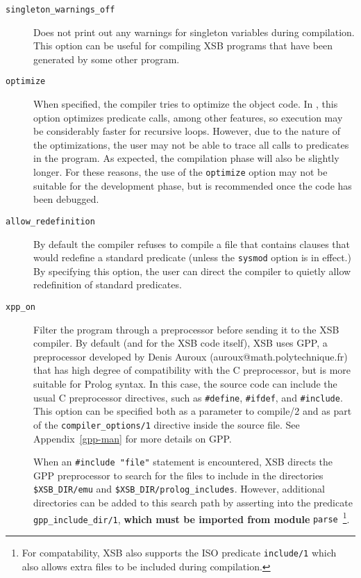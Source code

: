 \begin{description}
\item[{\tt singleton\_warnings\_off}] Does not print out any warnings
  for singleton variables during compilation.  This option can be
  useful for compiling XSB programs that have been generated by some
  other program.
%
\item[{\tt optimize}] When specified, the
  compiler tries to optimize the object code.  In \version, this
  option optimizes predicate calls, among other features, so execution
  may be considerably faster for recursive loops.  However, due to the
  nature of the optimizations, the user may not be able to trace all
  calls to predicates in the program.  As expected, the compilation
  phase will also be slightly longer.  For these reasons, the use of
  the {\tt optimize} option may not be suitable for the development
  phase, but is recommended once the code has been debugged.
%
\item[{\tt allow\_redefinition}] 
	By default the compiler refuses to compile a file that
	contains clauses that would redefine a standard predicate
	(unless the {\tt sysmod} option is in effect.)  By specifying
	this option, the user can direct the compiler to quietly allow
	redefinition of standard predicates.
%
\item[{\tt xpp\_on}]
  Filter the program through a preprocessor  before sending it to the XSB 
  compiler. By default (and for the XSB code itself), XSB uses GPP, a
  preprocessor developed by Denis Auroux (auroux@math.polytechnique.fr)
  that has high degree of compatibility with the C preprocessor, but is
  more suitable for Prolog syntax. In this case, the source code can
  include the usual C 
  preprocessor directives, such as \verb|#define|, \verb|#ifdef|, and
  \verb|#include|. This option can be specified both as a parameter to
  compile/2 and as part of the {\tt compiler\_options/1} directive inside
  the source file. See Appendix~\ref{gpp-man} for more details on GPP.

  When an \verb|#include "file"| statement is encountered, XSB directs
  the GPP preprocessor to search for the files to include in the
  directories \verb|$XSB_DIR/emu| and
  \verb|$XSB_DIR/prolog_includes|. 
  However, additional directories can be added to this search path by
  asserting into the predicate \verb|gpp_include_dir/1|, {\bf which
    must be imported from module} {\tt parse}~\footnote{For
    compatability, XSB also supports the ISO predicate {\tt include/1}
    which also allows extra files to be included during compilation.}.
  

\end{description}
